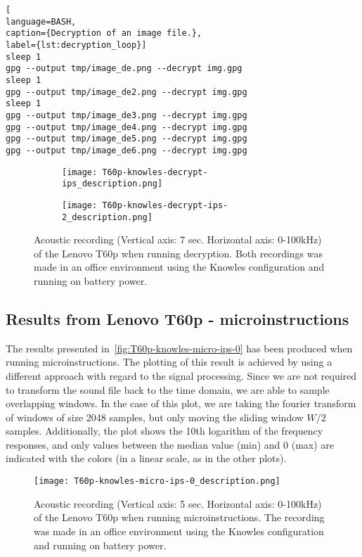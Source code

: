 \begin{lstlisting}[
language=BASH, 
caption={Decryption of an image file.}, 
label={lst:decryption_loop}]
sleep 1             
gpg --output tmp/image_de.png --decrypt img.gpg
sleep 1
gpg --output tmp/image_de2.png --decrypt img.gpg
sleep 1
gpg --output tmp/image_de3.png --decrypt img.gpg
gpg --output tmp/image_de4.png --decrypt img.gpg    
gpg --output tmp/image_de5.png --decrypt img.gpg
gpg --output tmp/image_de6.png --decrypt img.gpg
\end{lstlisting}

\begin{figure}[ht]
    \begin{subfigure}{0.5\textwidth}
        \centering
        \texttt{[image: T60p-knowles-decrypt-ips\_description.png]}
        \caption{}
        \label{fig:T60p-knowles-decrypt-ips}
    \end{subfigure}
    \begin{subfigure}{0.5\textwidth}
        \centering
        \texttt{[image: T60p-knowles-decrypt-ips-2\_description.png]}
        \caption{}
        \label{fig:T60p-knowles-decrypt-ips-2}
    \end{subfigure}
    \caption{Acoustic recording (Vertical axis: 7 sec. Horizontal axis: 0-100kHz) of the Lenovo T60p when running decryption.
    Both recordings was made in an office environment using the Knowles configuration and running on battery power. }
    \label{fig:T60p-knowles-decrypt-ips}
\end{figure}

\subsection{Results from Lenovo T60p - microinstructions}\label{chp5:subsec:t60p_knowles_results_micro}
The results presented in~\autoref{fig:T60p-knowles-micro-ips-0} has been produced when running microinstructions.
The plotting of this result is achieved by using a different approach with regard to the signal processing. 
Since we are not required to transform the sound file back to the time domain, we are able to sample overlapping windows.
In the case of this plot, we are taking the fourier transform of windows of size 2048 samples, but only moving the sliding window \({W/2}\) samples.
Additionally, the plot shows the 10th logarithm of the frequency responses, and only values between the median value (min) and 0 (max) are indicated with the colors (in a linear scale, as in the other plots). 
\begin{figure}[ht]
    \centering
    \texttt{[image: T60p-knowles-micro-ips-0\_description.png]}
    \caption{Acoustic recording (Vertical axis: 5 sec. Horizontal axis: 0-100kHz) of the Lenovo T60p when running microinstructions. The recording was made in an office environment using the Knowles configuration and running on battery power. }
    \label{fig:T60p-knowles-micro-ips-0}
\end{figure}
